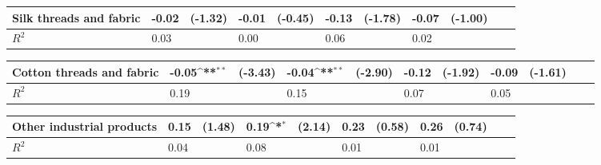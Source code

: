 \def\sym#1{\ifmmode^{#1}\else\(^{#1}\)\fi}
\begin{tabular}{p{4cm} p{1.4cm} p{1.2cm} p{1.5cm}  p{1.5cm} p{1.4cm} p{1.2cm} p{1.5cm} p{1.5cm}  p{1.5cm} p{1.5cm} }
\hline
Silk threads and fabric&    -0.02         &  (-1.32)&    -0.01         &  (-0.45)&    -0.13         &  (-1.78)&    -0.07         &  (-1.00)\\
\hline
\(R^{2}\)       &     0.03         &         &     0.00         &         &     0.06         &         &     0.02         &         \\
\end{tabular}
\def\sym#1{\ifmmode^{#1}\else\(^{#1}\)\fi}
\begin{tabular}{p{4cm} p{1.4cm} p{1.2cm} p{1.5cm}  p{1.5cm} p{1.4cm} p{1.2cm} p{1.5cm} p{1.5cm}  p{1.5cm} p{1.5cm} }
\hline
Cotton threads and fabric&    -0.05\sym{**} &  (-3.43)&    -0.04\sym{**} &  (-2.90)&    -0.12         &  (-1.92)&    -0.09         &  (-1.61)\\
\hline
\(R^{2}\)       &     0.19         &         &     0.15         &         &     0.07         &         &     0.05         &         \\
\end{tabular}
\def\sym#1{\ifmmode^{#1}\else\(^{#1}\)\fi}
\begin{tabular}{p{4cm} p{1.4cm} p{1.2cm} p{1.5cm}  p{1.5cm} p{1.4cm} p{1.2cm} p{1.5cm} p{1.5cm}  p{1.5cm} p{1.5cm} }
\hline
Other industrial products&     0.15         &   (1.48)&     0.19\sym{*}  &   (2.14)&     0.23         &   (0.58)&     0.26         &   (0.74)\\
\hline
\(R^{2}\)       &     0.04         &         &     0.08         &         &     0.01         &         &     0.01         &         \\
\end{tabular}
